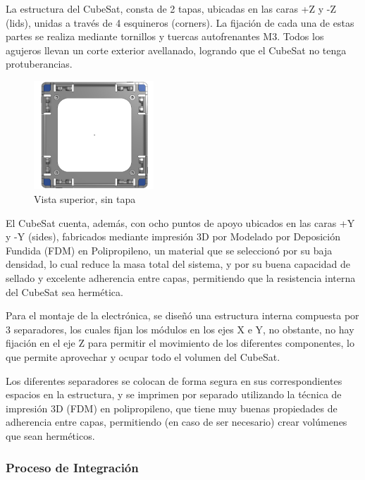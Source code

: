      La estructura del CubeSat, consta de 2 tapas, ubicadas en las caras +Z y -Z (lids), unidas a través
      de 4 esquineros (corners). La fijación de cada una de estas partes se realiza mediante tornillos y
      tuercas autofrenantes M3. Todos los agujeros llevan un corte exterior avellanado, logrando que el
      CubeSat no tenga protuberancias.

      \begin{figure}
        \centering
        \includegraphics[width=0.4\textwidth]{image/structure/superior.png}
        \caption{Vista superior, sin tapa}
        \label{fig:superior}
      \end{figure}
      El CubeSat cuenta, además, con ocho puntos de apoyo ubicados en las caras +Y y -Y (sides),
      fabricados mediante impresión 3D por Modelado por Deposición Fundida (FDM) en Polipropileno, un
      material que se seleccionó por su baja densidad, lo cual reduce la masa total del sistema, y por
      su buena capacidad de sellado y excelente adherencia entre capas, permitiendo que la resistencia
      interna del CubeSat sea hermética.

      Para el montaje de la electrónica, se diseñó una estructura interna compuesta por 3 separadores,
      los cuales fijan los módulos en los ejes X e Y, no obstante, no hay fijación en el eje Z para
      permitir el movimiento de los diferentes componentes, lo que permite aprovechar y ocupar todo el
      volumen del CubeSat.

      Los diferentes separadores se colocan de forma segura en sus correspondientes espacios en la
      estructura, y se imprimen por separado utilizando la técnica de impresión 3D (FDM) en polipropileno,
      que tiene muy buenas propiedades de adherencia entre capas, permitiendo (en caso de ser necesario)
      crear volúmenes que sean herméticos.
    \subsubsection{Proceso de Integración}

